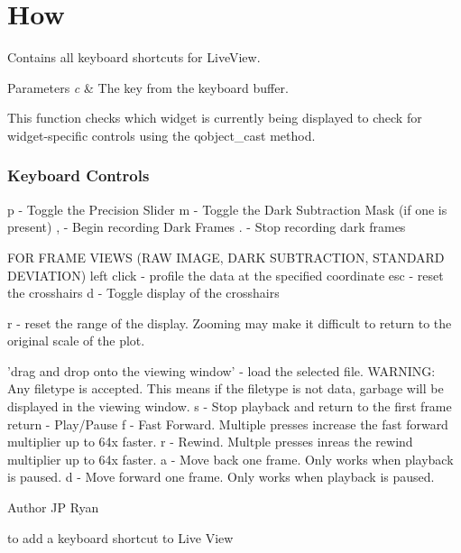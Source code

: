 \hypertarget{How-example}{\section{How}
}
Contains all keyboard shortcuts for Live\+View. 
\begin{DoxyParams}{Parameters}
{\em c} & The key from the keyboard buffer. \\
\hline
\end{DoxyParams}


This function checks which widget is currently being displayed to check for widget-\/specific controls using the qobject\+\_\+cast method. 

\subsubsection*{Keyboard Controls }

p -\/ Toggle the Precision Slider m -\/ Toggle the Dark Subtraction Mask (if one is present) , -\/ Begin recording Dark Frames . -\/ Stop recording dark frames 

F\+O\+R F\+R\+A\+M\+E V\+I\+E\+W\+S (R\+A\+W I\+M\+A\+G\+E, D\+A\+R\+K S\+U\+B\+T\+R\+A\+C\+T\+I\+O\+N, S\+T\+A\+N\+D\+A\+R\+D D\+E\+V\+I\+A\+T\+I\+O\+N) left click -\/ profile the data at the specified coordinate esc -\/ reset the crosshairs d -\/ Toggle display of the crosshairs 

r -\/ reset the range of the display. Zooming may make it difficult to return to the original scale of the plot. 

'drag and drop onto the viewing window' -\/ load the selected file. W\+A\+R\+N\+I\+N\+G\+: Any filetype is accepted. This means if the filetype is not data, garbage will be displayed in the viewing window. s -\/ Stop playback and return to the first frame return -\/ Play/\+Pause f -\/ Fast Forward. Multiple presses increase the fast forward multiplier up to 64x faster. r -\/ Rewind. Multple presses inreas the rewind multiplier up to 64x faster. a -\/ Move back one frame. Only works when playback is paused. d -\/ Move forward one frame. Only works when playback is paused.

\begin{DoxyAuthor}{Author}
J\+P Ryan
\end{DoxyAuthor}
to add a keyboard shortcut to Live View


\begin{DoxyCodeInclude}
\end{DoxyCodeInclude}
 